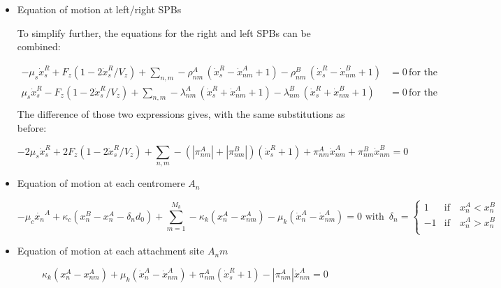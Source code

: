 \documentclass[a4paper,12pt]{article}
\begin{document}
\begin{itemize}

\item Equation of motion at left/right SPBs

To simplify further, the equations for the right and left SPBs can be
combined:
 
\begin{equation}
  \begin{aligned}
    - \mu_s\dot{x}^R_s + F_{z}\left(1 - 2\dot{x}^R_s/V_z\right)%
    + \sum_{n,m} - \rho_{nm}^A\,\left(\dot{x}^R_s - \dot{x}^A_{nm} +%
      1\right) - \rho_{nm}^B\,\left(\dot{x}^R_s - \dot{x}^B_{nm} +%
      1\right)&= 0 \, \mbox{for the right SPB}\\
    \mu_s\dot{x}^R_s - F_{z}\left(1 - 2\dot{x}^R_s/V_z\right)%
    + \sum_{n,m} -\lambda_{nm}^A\,\left(\dot{x}^R_s + \dot{x}^A_{nm} +%
      1\right) - \lambda_{nm}^B\,\left(\dot{x}^R_s + \dot{x}^B_{nm} +%
      1\right) &= 0 \, \mbox{for the left SPB}\\
  \end{aligned}
\end{equation}
The difference of those two expressions gives, with the same substitutions as before:

\begin{equation}
  \label{eq:spindle_term}
  - 2\mu_s\dot{x}^R_s + 2F_{z}\left(1 - 2\dot{x}^R_s/V_z\right)%
  + \sum_{n,m}- (|\pi_{nm}^A|  + |\pi_{nm}^B|)(\dot{x}^R_s + 1)%
  + \pi_{nm}^A \dot{x}_{nm}^A + \pi_{nm}^B \dot{x}_{nm}^B= 0%
\end{equation}


\item Equation of motion at each centromere $A_n$

\begin{equation}
-\mu_c \dot{x_n}^A+\kappa_c (x_n^B - x_n^A - \delta_n d_0) + \sum_{m = 1}^{M_k} -\kappa_k(x_n^A - x_{nm}^A) 
  - \mu_k(\dot{x}_n^A - \dot{x}_{nm}^A) = 0  %
    \mbox{ with }\, \delta_n =%
    \begin{cases}
      1  &\mathrm{if}\quad  x_n^A < x_n^B\\
      -1 &\mathrm{if}\quad  x_n^A > x_n^B\\
    \end{cases}
\end{equation}

\item Equation of motion at each attachment site $A_nm$

\begin{equation}
\kappa_k(x_n^A - x_{nm}^A) + \mu_k(\dot{x}_n^A - \dot{x}_{nm}^A) + \pi_{nm}^A(\dot{x}^R_s + 1) - |\pi_{nm}^A|\dot{x}^A_{nm} = 0
\end{equation}





\end{itemize}
\end{document}
